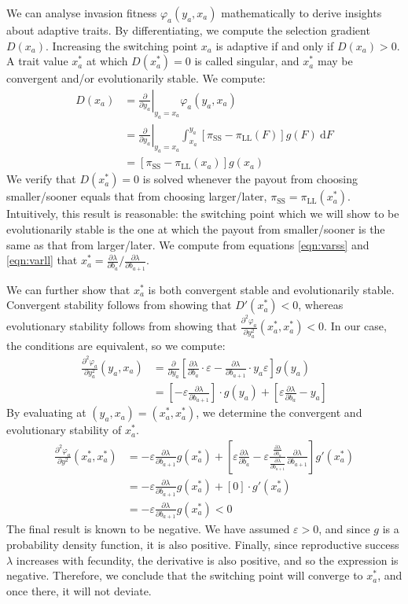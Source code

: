 \documentclass[titlepage, hidelinks, 12pt]{article}
\theoremstyle{plain}
\theoremstyle{remark}
\theoremstyle{definition}
\newcommand{\varSS}{\frac{\partial \lambda}{ \partial b_{a}}}
\newcommand{\varLL}{\frac{\partial \lambda}{ \partial b_{a+1}}}
\DeclareMathOperator{\smallersooner}{SS}
\DeclareMathOperator{\largerlater}{LL}
\renewcommand\d[1]{\:\textrm{d}#1}
\begin{document}
We can analyse invasion fitness $\varphi_a(y_a, x_a)$ mathematically to derive insights about adaptive traits. By differentiating, we compute
the selection gradient $D(x_a)$. Increasing the switching point $x_a$ is adaptive if and only if $D(x_a) > 0$. A trait value $x_a^*$ at which
$D(x_a^*) = 0$ is called singular, and $x_a^*$ may be convergent and/or evolutionarily stable. 
We compute:
\begin{align}
    D(x_a) &= \left.\frac{\partial }{\partial y_a} \right\vert_{y_a = x_a}\varphi_a(y_a, x_a)  \\
    &=\left.\frac{\partial }{\partial y_a} \right\vert_{y_a = x_a}  \int_{x_a}^{y_a} \left[ \pi_{\smallersooner} - \pi_{\largerlater}(F) \right]g(F) \d F\\
        &=\left[ \pi_{\smallersooner} - \pi_{\largerlater}(x_a)   \right]g(x_a) 
\end{align}
We verify that $D(x_a^*) = 0$ is solved whenever the payout from choosing smaller/sooner equals that from choosing larger/later,
$\pi_{\smallersooner} = \pi_{\largerlater}(x_a^*)$. Intuitively, this result is reasonable: the switching point which we will show to be evolutionarily
stable is the one at which the payout from smaller/sooner is the same as that from larger/later. 
We compute from equations \ref{eqn:varss} and \ref{eqn:varll} that
$x_a^* =  \varSS/\varLL$. 

We can further show that $x_a^*$ 
is both convergent stable and evolutionarily stable. Convergent stability follows from showing that $D'(x_a^*) < 0$, whereas evolutionary
stability follows from showing that $\frac{\partial^2 \varphi_a}{\partial y_a^2}(x_a^*, x_a^*)< 0$. In our case, the conditions are equivalent,
so we compute:
\begin{align}
    \frac{\partial^2 \varphi_a}{\partial y_a^2}(y_a, x_a) &=\frac{\partial}{\partial y_a}\left[\varSS \cdot \varepsilon  - \varLL \cdot y_a\varepsilon \right] g(y_a)\\
    &= \left[ -\varepsilon \varLL \right]\cdot g(y_a) + \left[ \varepsilon \varSS - y_a \right]
\end{align}
By evaluating at $(y_a, x_a) = (x_a^*, x_a^*)$, we determine the convergent and evolutionary stability of $x_a^*$. 
\begin{align}
    \frac{\partial^2 \varphi_a}{\partial y^2}(x_a^*, x_a^*) &= -\varepsilon \varLL g(x_a^*) + \left[ \varepsilon \varSS - \varepsilon \frac{\varSS}{\varLL}
    \varLL\right]g'(x_a^*) \\
    &= -\varepsilon \varLL g(x_a^*) + \left[0  \right]\cdot g'(x_a^*)\\
    &= -\varepsilon\varLL g(x_a^*) < 0
\end{align}
The final result is known to be negative. We have assumed $\varepsilon > 0$, and since $g$ is a probability density function, it is also
positive. Finally, since reproductive success $\lambda$ increases with fecundity, the derivative is also positive, and so the expression is
negative. 
Therefore, we conclude that the switching point will converge to $x_a^*$, and once there, it will not deviate. 
\end{document}
